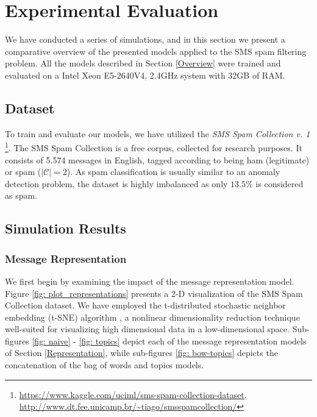 \documentclass[letterpaper]{article}
\begin{document}
\section{Experimental Evaluation} \label{Experimental Evaluation}

We have conducted a series of simulations, and in this section we present a comparative overview of the presented models applied to the SMS spam filtering problem. All the models described in Section \ref{Overview} were trained and evaluated on a Intel Xeon E5-2640V4, 2.4GHz system with 32GB of RAM.

\subsection{Dataset}  \label{Dataset}

To train and evaluate our models, we have utilized the \emph{SMS Spam Collection v. 1} \footnote{\url{https://www.kaggle.com/uciml/sms-spam-collection-dataset}, \\ \url{http://www.dt.fee.unicamp.br/~tiago/smsspamcollection/}}. The SMS Spam Collection is a free corpus, collected for research purposes. It consists of 5.574 messages in English, tagged according to being ham (legitimate) or spam ($|\mathcal{C}| = 2$). As spam classification is usually similar to an anomaly detection problem, the dataset is highly imbalanced as only $13.5\%$ is considered as spam.

\subsection{Simulation Results}  \label{Simulation Results}

\subsubsection{Message Representation}  \label{Representation Results}

We first begin by examining the impact of the message representation model. Figure \ref{fig: plot_representations} presents a 2-D visualization of the SMS Spam Collection dataset. We have employed the t-distributed stochastic neighbor embedding (t-SNE) algorithm \cite{maaten2008visualizing}, a nonlinear dimensionality reduction technique well-suited for visualizing high dimensional data in a low-dimensional space. Sub-figures \ref{fig: naive} - \ref{fig: topics} depict each of the message representation models of Section \ref{Representation}, while sub-figures \ref{fig: bow-topics} depicts the concatenation of the bag of words and topics models.
\end{document}

